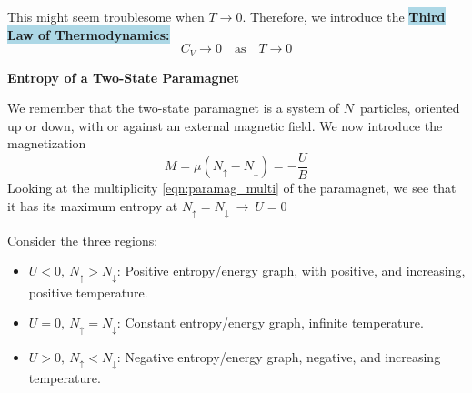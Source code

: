 \documentclass[8pt, a4paper]{extarticle}
\newcommand{\bll}{\colorbox{lightblue}}
\newcommand{\rdd}{\colorbox{lightred}}
\begin{document}
\begin{twocolumn}
\begin{framed}
This might seem troublesome when $T \rightarrow 0$. Therefore, we introduce the \bll{\textbf{Third Law of Thermodynamics:}}
\vspace{-.2cm}\[
	C_V \rightarrow 0 \quad \text{as} \quad T \rightarrow 0
\]\vspace{-.2cm}
\end{framed}



\rdd{\textbf{Entropy of a Two-State Paramagnet}}
\begin{framed}
We remember that the two-state paramagnet is a system of $N$ particles, oriented up or down, with or against an external magnetic field. We now introduce the magnetization
\vspace{-.2cm}\[
    M = \mu(N_\uparrow - N_\downarrow) = - \frac{U}{B}
\]
Looking at the multiplicity \ref{eqn:paramag_multi} of the paramagnet, we see that it has its maximum entropy at $N_\uparrow = N_\downarrow \ \rightarrow\ U = 0$

Consider the three regions:
\begin{itemize}
    \item $U < 0,\ N_\uparrow > N_\downarrow$: Positive entropy/energy graph, with positive, and increasing, positive temperature.
    \item $U = 0,\ N_\uparrow = N_\downarrow$: Constant entropy/energy graph, infinite temperature.
    \item $ U > 0,\ N_\uparrow < N_\downarrow$: Negative entropy/energy graph, negative, and increasing temperature.
\end{itemize}


\end{framed}
\end{twocolumn}
\end{document}
